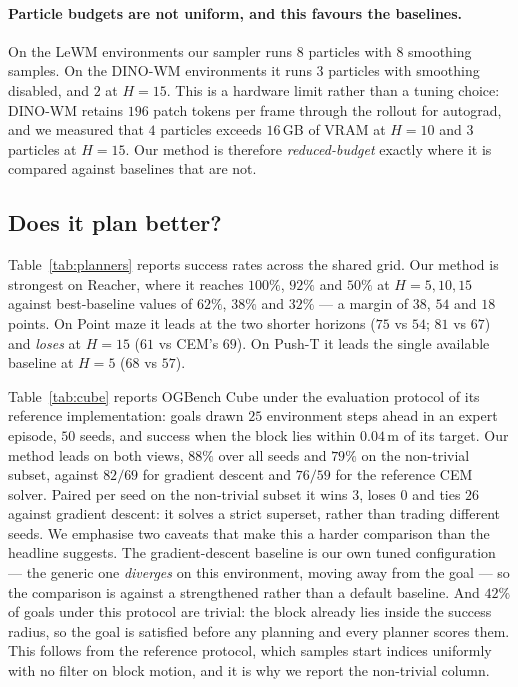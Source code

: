 \paragraph{Particle budgets are not uniform, and this favours the baselines.}
On the LeWM environments our sampler runs $8$ particles with $8$ smoothing
samples. On the DINO-WM environments it runs $3$ particles with smoothing
disabled, and $2$ at $H{=}15$. This is a hardware limit rather than a tuning
choice: DINO-WM retains $196$ patch tokens per frame through the rollout for
autograd, and we measured that $4$ particles exceeds $16$\,GB of VRAM at
$H{=}10$ and $3$ particles at $H{=}15$. Our method is therefore
\emph{reduced-budget} exactly where it is compared against baselines that are
not.

\subsection{Does it plan better?}
\label{sec:exp:planning}

Table~\ref{tab:planners} reports success rates across the shared grid. Our
method is strongest on Reacher, where it reaches $100\%$, $92\%$ and $50\%$ at
$H=5,10,15$ against best-baseline values of $62\%$, $38\%$ and $32\%$ --- a
margin of $38$, $54$ and $18$ points. On Point maze it leads at the two shorter
horizons ($75$ vs $54$; $81$ vs $67$) and \emph{loses} at $H{=}15$ ($61$ vs CEM's
$69$). On Push-T it leads the single available baseline at $H{=}5$ ($68$ vs
$57$).

Table~\ref{tab:cube} reports OGBench Cube under the evaluation protocol of its
reference implementation: goals drawn $25$ environment steps ahead in an expert
episode, $50$ seeds, and success when the block lies within $0.04$\,m of its
target. Our method leads on both views, $88\%$ over all seeds and $79\%$ on the
non-trivial subset, against $82/69$ for gradient descent and $76/59$ for the
reference CEM solver. Paired per seed on the non-trivial subset it wins $3$,
loses $0$ and ties $26$ against gradient descent: it solves a strict superset,
rather than trading different seeds. We emphasise two caveats that make this a
harder comparison than the headline suggests. The gradient-descent baseline is
our own tuned configuration --- the generic one \emph{diverges} on this
environment, moving away from the goal --- so the comparison is against a
strengthened rather than a default baseline. And $42\%$ of goals under this
protocol are trivial: the block already lies inside the success radius, so the
goal is satisfied before any planning and every planner scores them. This
follows from the reference protocol, which samples start indices uniformly with
no filter on block motion, and it is why we report the non-trivial column.


